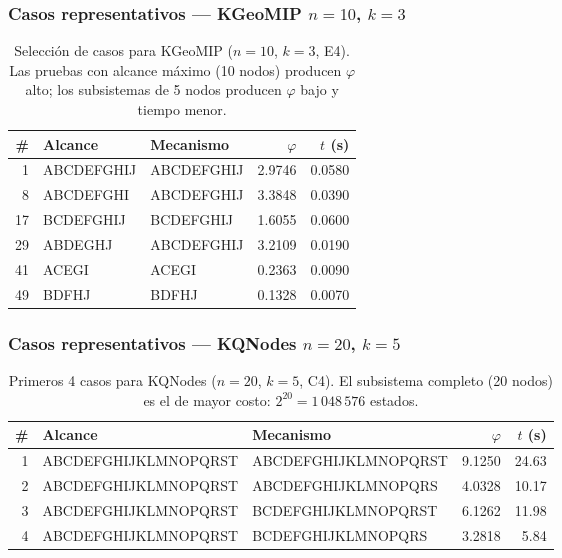 \subsubsection*{Casos representativos — KGeoMIP $n=10$, $k=3$}

\begin{table}[H]
\centering
\begin{tabular}{rllrr}
  \toprule
  \textbf{\#} & \textbf{Alcance} & \textbf{Mecanismo} &
  $\varphi$ & $t$ (s) \\
  \midrule
  1  & ABCDEFGHIJ & ABCDEFGHIJ & 2.9746 & 0.0580 \\
  8  & ABCDEFGHI  & ABCDEFGHIJ & 3.3848 & 0.0390 \\
  17 & BCDEFGHIJ  & BCDEFGHIJ  & 1.6055 & 0.0600 \\
  29 & ABDEGHJ    & ABCDEFGHIJ & 3.2109 & 0.0190 \\
  41 & ACEGI      & ACEGI      & 0.2363 & 0.0090 \\
  49 & BDFHJ      & BDFHJ      & 0.1328 & 0.0070 \\
  \bottomrule
\end{tabular}
\caption{Selección de casos para KGeoMIP ($n=10$, $k=3$, E4).
  Las pruebas con alcance máximo (10 nodos) producen $\varphi$ alto;
  los subsistemas de 5 nodos producen $\varphi$ bajo y tiempo menor.}
\label{tab:casos_kgeomip}
\end{table}

\subsubsection*{Casos representativos — KQNodes $n=20$, $k=5$}

\begin{table}[H]
\centering
\begin{tabular}{rllrr}
  \toprule
  \textbf{\#} & \textbf{Alcance} & \textbf{Mecanismo} &
  $\varphi$ & $t$ (s) \\
  \midrule
  1 & ABCDEFGHIJKLMNOPQRST & ABCDEFGHIJKLMNOPQRST & 9.1250 & 24.63 \\
  2 & ABCDEFGHIJKLMNOPQRST & ABCDEFGHIJKLMNOPQRS  & 4.0328 & 10.17 \\
  3 & ABCDEFGHIJKLMNOPQRST & BCDEFGHIJKLMNOPQRST  & 6.1262 & 11.98 \\
  4 & ABCDEFGHIJKLMNOPQRST & BCDEFGHIJKLMNOPQRS   & 3.2818 &  5.84 \\
  \bottomrule
\end{tabular}
\caption{Primeros 4 casos para KQNodes ($n=20$, $k=5$, C4).
  El subsistema completo (20 nodos) es el de mayor costo: $2^{20} = 1\,048\,576$ estados.}
\label{tab:casos_kqnodes_n20}
\end{table}

